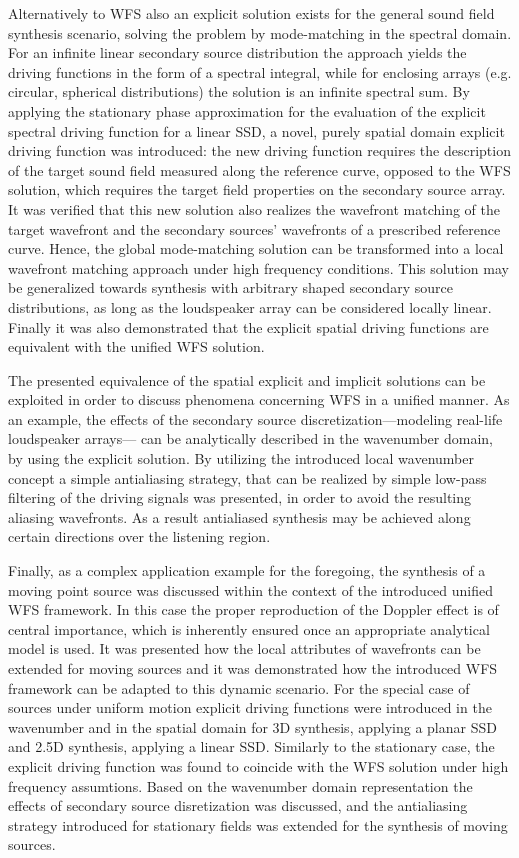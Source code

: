 Alternatively to WFS also an explicit solution exists for the general sound field synthesis scenario, solving the problem by mode-matching in the spectral domain.
For an infinite linear secondary source distribution the approach yields the driving functions in the form of a spectral integral, while for enclosing arrays (e.g. circular, spherical distributions) the solution is an infinite spectral sum.
By applying the stationary phase approximation for the evaluation of the explicit spectral driving function for a linear SSD, a novel, purely spatial domain explicit driving function was introduced: the new driving function requires the description of the target sound field measured along the reference curve, opposed to the WFS solution, which requires the target field properties on the secondary source array.
It was verified that this new solution also realizes the wavefront matching of the target wavefront and the secondary sources' wavefronts of a prescribed reference curve.
Hence, the global mode-matching solution can be transformed into a local wavefront matching approach under high frequency conditions.
This solution may be generalized towards synthesis with arbitrary shaped secondary source distributions, as long as the loudspeaker array can be considered locally linear.
Finally it was also demonstrated that the explicit spatial driving functions are equivalent with the unified WFS solution.

The presented equivalence of the spatial explicit and implicit solutions can be exploited in order to discuss phenomena concerning WFS in a unified manner.
As an example, the effects of the secondary source discretization---modeling real-life loudspeaker arrays--- can be analytically described in the wavenumber domain, by using the explicit solution.
By utilizing the introduced local wavenumber concept a simple antialiasing strategy, that can be realized by simple low-pass filtering of the driving signals was presented, in order to avoid the resulting aliasing wavefronts.
As a result antialiased synthesis may be achieved along certain directions over the listening region.

Finally, as a complex application example for the foregoing, the synthesis of a moving point source was discussed within the context of the introduced unified WFS framework.
In this case the proper reproduction of the Doppler effect is of central importance, which is inherently ensured once an appropriate analytical model is used.
It was presented how the local attributes of wavefronts can be extended for moving sources and it was demonstrated how the introduced WFS framework can be adapted to this dynamic scenario.
For the special case of sources under uniform motion explicit driving functions were introduced in the wavenumber and in the spatial domain for 3D synthesis, applying a planar SSD and 2.5D synthesis, applying a linear SSD.
Similarly to the stationary case, the explicit driving function was found to coincide with the WFS solution under high frequency assumtions.
Based on the wavenumber domain representation the effects of secondary source disretization was discussed, and the antialiasing strategy introduced for stationary fields was extended for the synthesis of moving sources.

